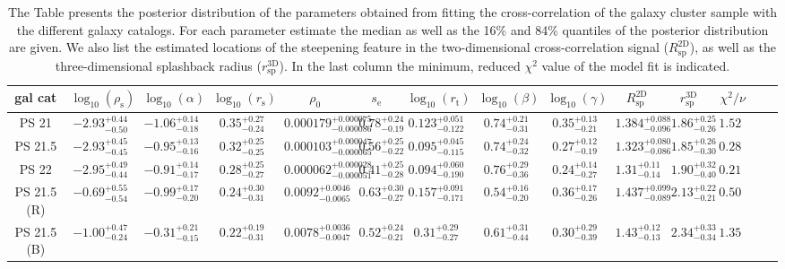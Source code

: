 \documentclass[iop, apjl, twocolappendix, numberedappendix]{emulateapj}
\begin{document}
\begin{table}
    \centering
    \caption{The Table presents the posterior distribution of the parameters obtained from fitting the cross-correlation of the galaxy cluster sample with the different galaxy catalogs. For each parameter estimate the median as well as the 16\% and 84\% quantiles of the posterior distribution are given. We also list the estimated locations of the steepening feature in the two-dimensional cross-correlation signal ($R_{\mathrm{sp}}^{\mathrm{2D}}$), as well as the three-dimensional splashback radius ($r_{\mathrm{sp}}^{\mathrm{3D}}$). In the last column the minimum, reduced $\chi^2$ value of the model fit is indicated.}
    \label{tab:fit_parameters}
    \begin{tabular}{cccccccccccccc}
    \hline
gal cat & $\log_{10}(\rho_{\mathrm{s}})$ & $\log_{10}(\alpha)$ & $\log_{10}(r_{\mathrm{s}})$ & $\rho_{\mathrm{0}}$ & $s_{\mathrm{e}}$ & $\log_{10}(r_{\mathrm{t}})$ & $\log_{10}(\beta)$ & $\log_{10}(\gamma)$ & $R_{\mathrm{sp}}^{\mathrm{2D}}$ & $r_{\mathrm{sp}}^{\mathrm{3D}}$ & $\chi^2/\nu$ \\
\hline
\hline
PS 21 & $-2.93_{-0.50}^{+0.44}$ & $-1.06_{-0.18}^{+0.14}$ & $0.35_{-0.24}^{+0.27}$ & $0.000179_{-0.000086}^{+0.000075}$ & $0.78_{-0.19}^{+0.24}$ & $0.123_{-0.122}^{+0.051}$ & $0.74_{-0.31}^{+0.21}$ & $0.35_{-0.21}^{+0.13}$ &$1.384_{-0.096}^{+0.088}$&$1.86_{-0.26}^{+0.25}$& $1.524$ \\
\hline
PS 21.5 & $-2.93_{-0.45}^{+0.45}$ & $-0.95_{-0.16}^{+0.13}$ & $0.32_{-0.25}^{+0.25}$ & $0.000103_{-0.000065}^{+0.000047}$ & $0.56_{-0.22}^{+0.25}$ & $0.095_{-0.115}^{+0.045}$ & $0.74_{-0.32}^{+0.24}$ & $0.27_{-0.19}^{+0.12}$ &$1.323_{-0.086}^{+0.080}$&$1.85_{-0.30}^{+0.26}$& $0.285$ \\
\hline
PS 22 & $-2.95_{-0.44}^{+0.49}$ & $-0.91_{-0.17}^{+0.14}$ & $0.28_{-0.27}^{+0.25}$ & $0.000062_{-0.000051}^{+0.000028}$ & $0.41_{-0.28}^{+0.25}$ & $0.094_{-0.190}^{+0.060}$ & $0.76_{-0.36}^{+0.29}$ & $0.24_{-0.27}^{+0.14}$ &$1.31_{-0.14}^{+0.11}$&$1.90_{-0.40}^{+0.32} $&$0.211$ \\
\hline
PS 21.5 (R) & $-0.69_{-0.54}^{+0.55}$ & $-0.99_{-0.20}^{+0.17}$ & $0.24_{-0.31}^{+0.30}$ & $0.0092_{-0.0065}^{+0.0046}$ & $0.63_{-0.27}^{+0.30}$ & $0.157_{-0.171}^{+0.091}$ & $0.54_{-0.20}^{+0.16}$ & $0.36_{-0.26}^{+0.17}$ & $1.437_{-0.089}^{+0.099}$ & $2.13_{-0.21}^{+0.22}$ & $0.502$ \\
\hline
PS 21.5 (B) & $-1.00_{-0.24}^{+0.47}$ & $-0.31_{-0.15}^{+0.21}$ & $0.22_{-0.31}^{+0.19}$ & $0.0078_{-0.0047}^{+0.0036}$ & $0.52_{-0.21}^{+0.24}$ & $0.31_{-0.27}^{+0.29}$ & $0.61_{-0.44}^{+0.31}$ & $0.30_{-0.39}^{+0.29}$ & $1.43_{-0.13}^{+0.12}$ & $2.34_{-0.34}^{+0.33}$ & $1.355$ \\
\hline
    \end{tabular}
\end{table}
\end{document}
